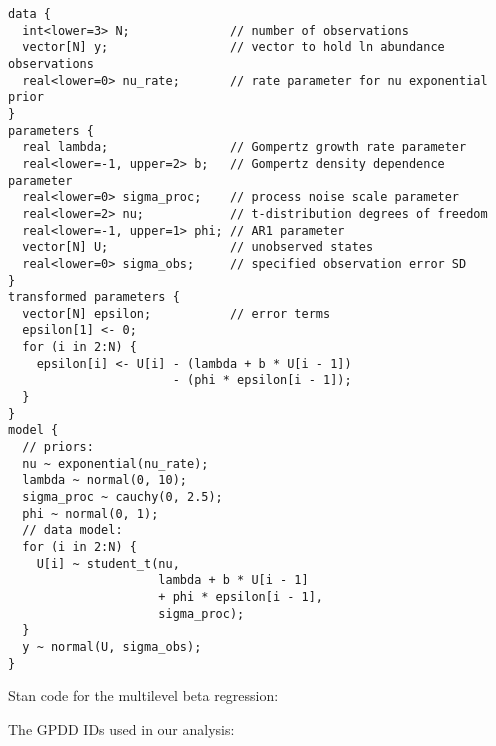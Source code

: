 \begin{spacing}{1.15}
\begin{footnotesize}
\begin{verbatim}
data {
  int<lower=3> N;              // number of observations
  vector[N] y;                 // vector to hold ln abundance observations
  real<lower=0> nu_rate;       // rate parameter for nu exponential prior
}
parameters {
  real lambda;                 // Gompertz growth rate parameter
  real<lower=-1, upper=2> b;   // Gompertz density dependence parameter
  real<lower=0> sigma_proc;    // process noise scale parameter
  real<lower=2> nu;            // t-distribution degrees of freedom
  real<lower=-1, upper=1> phi; // AR1 parameter
  vector[N] U;                 // unobserved states
  real<lower=0> sigma_obs;     // specified observation error SD
}
transformed parameters {
  vector[N] epsilon;           // error terms
  epsilon[1] <- 0;
  for (i in 2:N) {
    epsilon[i] <- U[i] - (lambda + b * U[i - 1])
                       - (phi * epsilon[i - 1]);
  }
}
model {
  // priors:
  nu ~ exponential(nu_rate);
  lambda ~ normal(0, 10);
  sigma_proc ~ cauchy(0, 2.5);
  phi ~ normal(0, 1);
  // data model:
  for (i in 2:N) {
    U[i] ~ student_t(nu,
                     lambda + b * U[i - 1]
                     + phi * epsilon[i - 1],
                     sigma_proc);
  }
  y ~ normal(U, sigma_obs);
}
\end{verbatim}
\end{footnotesize}

\clearpage
\noindent
Stan code for the multilevel beta regression:
\begin{footnotesize}

\end{footnotesize}

\clearpage

\noindent
The GPDD IDs used in our analysis:

\begin{footnotesize}
\noindent
{\tt

}
\end{footnotesize}
\end{spacing}
